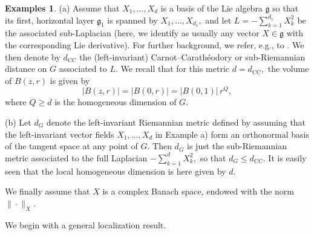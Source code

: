 \documentclass[leqno]{amsart}
\theoremstyle{definition}
\newtheorem*{examples}{Examples}
\theoremstyle{remark}
\numberwithin{equation}{section}
\newcommand{\g}{\mathfrak{g}}
\begin{document}
\begin{examples}

(a) Assume that  $X_1,\dots, X_d$ is a basis of the Lie algebra $\g$ so that its first, horizontal layer $\g_1$ is spanned by $X_1,\dots,X_{d_1},$ and let $L=-\sum_{k=1}^{d_1}X_k^2$ be the associated sub-Laplacian (here, we identify as usually any vector $X\in \g$ with  the corresponding Lie derivative). For further background, we refer, e.g., to \cite{MaMueNi23}.
We then denote  by $d_{\mathrm{CC}}$  the (left-invariant) Carnot--Carathéodory or sub-Riemannian distance on $G$ associated 
to $L.$ We recall that for this metric $d=d_{\mathrm{CC}},$ the volume of $B(z,r)$ is given by  
\begin{equation}\label{ballvol}
|B(z,r)|=|B(0,r)|= |B(0,1)|\, r^Q,
\end{equation}
where  $Q\ge d$ is the homogeneous dimension of $G.$ 
\smallskip

(b) Let $d_G$ denote the left-invariant Riemannian metric defined by assuming that the left-invariant vector fields $X_1,\dots,X_d$ in Example a) form an orthonormal basis of the tangent space at any point of $G.$ Then $d_G$ is just  the sub-Riemannian metric associated to the full Laplacian 
$-\sum_{k=1}^{d}X_k^2,$ so that $d_G\le d_{\mathrm{CC}}.$ It is easily seen that the local homogeneous dimension is here given by $d.$

\end{examples}

We finally assume that $X$ is a complex Banach space, endowed with the norm $\|\cdot\|_X.$ 

\medskip

We begin with a general localization result.
\end{document}
